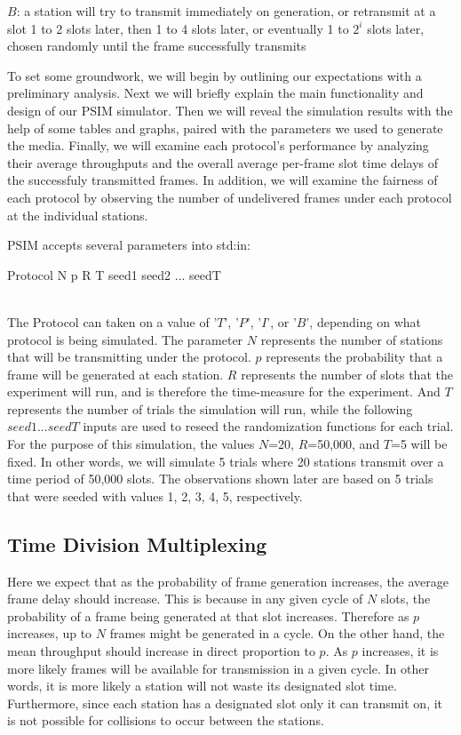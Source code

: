\documentclass[twocolumn]{article}
\begin{document}
$B$: a station will try to transmit immediately on generation, or retransmit at a slot 1 to 2 slots later, then 1 to 4 slots later, or eventually 1 to $2^i$ slots later, chosen randomly until the frame successfully transmits

	To set some groundwork, we will begin by outlining our expectations with a preliminary analysis. Next we will briefly explain the main functionality and design of our PSIM simulator. Then we will reveal the simulation results with the help of some tables and graphs, paired with the parameters we used to generate the media. Finally, we will examine each protocol's performance by analyzing their average throughputs and the overall average per-frame slot time delays of the successfuly transmitted frames. In addition, we will examine the fairness of each protocol by observing the number of undelivered frames under each protocol at the individual stations.

	PSIM accepts several parameters into std:in: 

\begin{center} Protocol N p R T seed1 seed2 ... seedT \end{center}
\\

The Protocol can taken on a value of '$T$', '$P$', '$I$', or '$B$', depending on what protocol is being simulated. The parameter $N$ represents the number of stations that will be transmitting under the protocol. $p$ represents the probability that a frame will be generated at each station. $R$ represents the number of slots that the experiment will run, and is therefore the time-measure for the experiment. And $T$ represents the number of trials the simulation will run, while the following $seed1...seedT$ inputs are used to reseed the randomization functions for each trial. For the purpose of this simulation, the values $N$=20, $R$=50,000, and $T$=5 will be fixed. In other words, we will simulate 5 trials where 20 stations transmit over a time period of 50,000 slots. The observations shown later are based on 5 trials that were seeded with values 1, 2, 3, 4, 5, respectively.
	
\subsection{Time Division Multiplexing}
Here we expect that as the probability of frame generation increases, the average frame delay should increase. This is because in any given cycle of $N$ slots, the probability of a frame being generated at that slot increases. Therefore as $p$ increases, up to $N$ frames might be generated in a cycle.
On the other hand, the mean throughput should increase in direct proportion to $p$. As $p$ increases, it is more likely frames will be available for transmission in a given cycle. In other words, it is more likely a station will not waste its designated slot time. Furthermore, since each station has a designated slot only it can transmit on, it is not possible for collisions to occur between the stations.
\end{document}
